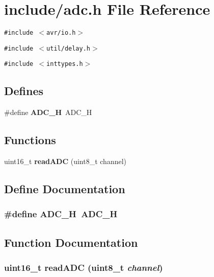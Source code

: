 \section{include/adc.h File Reference}
\label{adc_8h}
{\tt \#include $<$avr/io.h$>$}\par
{\tt \#include $<$util/delay.h$>$}\par
{\tt \#include $<$inttypes.h$>$}\par
\subsection*{Defines}
\begin{CompactItemize}
\item 
\#define {\bf ADC\_\-H}~ADC\_\-H
\end{CompactItemize}
\subsection*{Functions}
\begin{CompactItemize}
\item 
uint16\_\-t {\bf readADC} (uint8\_\-t channel)
\end{CompactItemize}


\subsection{Define Documentation}
\subsubsection{\setlength{\rightskip}{0pt plus 5cm}\#define ADC\_\-H~ADC\_\-H}\label{adc_8h_7d45c6fd49da9ab97ff07bff1c3ddee5}




\subsection{Function Documentation}
\subsubsection{\setlength{\rightskip}{0pt plus 5cm}uint16\_\-t readADC (uint8\_\-t {\em channel})}\label{adc_8h_812736491523e54e6bf10a142821e7fe}


